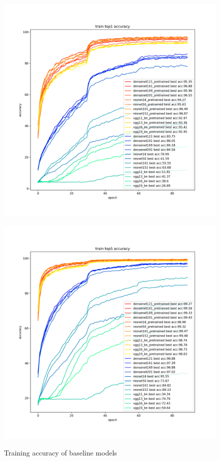 \begin{figure}[H]
  \begin{minipage}[t]{0.5\linewidth}
    \centering
    \includegraphics[width=1.1\textwidth]{figs/train_acc1.png}
    \label{fig:train_acc1}
  \end{minipage}\hfill
  \begin{minipage}[t]{0.5\linewidth}
    \centering
    \includegraphics[width=1.1\textwidth]{figs/train_acc5.png}
    \label{fig:train_acc5}
  \end{minipage}
  \caption{Training accuracy of baseline models}
\end{figure}


